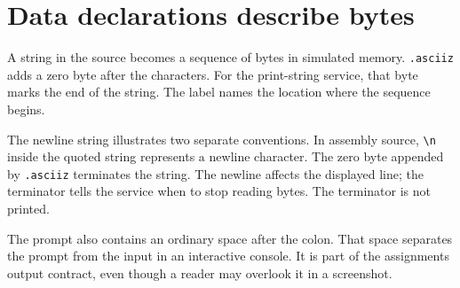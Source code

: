 \section{Data declarations describe
  bytes}\label{001-console-calculation-p02-data-declarations-describe-bytes}

A string in the source becomes a sequence of bytes in simulated memory.
\texttt{.asciiz} adds a zero byte after the characters. For the
print-string service, that byte marks the end of the string. The label
names the location where the sequence begins.

The newline string illustrates two separate conventions. In assembly
source, \texttt{\textbackslash{}n} inside the quoted string represents a
newline character. The zero byte appended by \texttt{.asciiz} terminates
the string. The newline affects the displayed line; the terminator tells
the service when to stop reading bytes. The terminator is not printed.

The prompt also contains an ordinary space after the colon. That space
separates the prompt from the input in an interactive console. It is
part of the assignment\textquotesingle s output contract, even though a
reader may overlook it in a screenshot.
